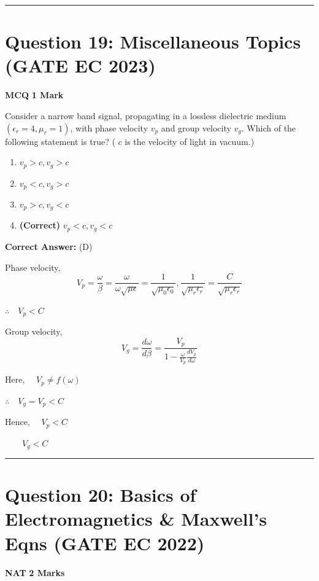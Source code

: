 \documentclass[11pt,a4paper]{article}
\begin{document}
\vspace{1.5em}
\hrule
\vspace{1.5em}

\section*{Question 19: Miscellaneous Topics (GATE EC 2023)}
\noindent \textbf{\color{primary}MCQ} \hfill \textbf{\color{secondary}1 Mark}


\noindent Consider a narrow band signal, propagating in a lossless dielectric medium $\left(\epsilon_{r}=4, \mu_{r}=1\right)$, with phase velocity $v_{p}$ and group velocity $v_{g}$. Which of the following statement is true? ( $c$ is the velocity of light in vacuum.)


\begin{enumerate}[label=(\Alph*)]
    \item $v_{p} > c, v_{g} > c$
    \item $v_{p} < c, v_{g} > c$
    \item $v_{p} > c, v_{g} < c$
    \item \textbf{(Correct)} $v_{p} < c, v_{g} < c$
\end{enumerate}

\noindent \textbf{Correct Answer:} (D)

\begin{tcolorbox}[solbox, title=Detailed Solution -- Question 19]
Phase velocity, 
\[
V_{p}=\frac{\omega}{\beta}=\frac{\omega}{\omega \sqrt{\mu \epsilon}}=\frac{1}{\sqrt{\mu_{0} \epsilon_{0}}}, \frac{1}{\sqrt{\mu_{r} \epsilon_{r}}}=\frac{C}{\sqrt{\mu_{r} \epsilon_{r}}}
\]

$\therefore \quad V_{p} < C$

Group velocity, 
\[
V_{g}=\frac{d \omega}{d \beta}=\frac{V_{p}}{1-\frac{\omega}{V_{p}} \frac{d V_{p}}{d \omega}}
\]

Here, $\quad V_{p} \neq f(\omega)$

$\therefore \quad V_{g}=V_{p} < C$

Hence, $\quad V_{p} < C$

$\quad \quad V_{g} < C$
\end{tcolorbox}

\vspace{1.5em}
\hrule
\vspace{1.5em}

\section*{Question 20: Basics of Electromagnetics \& Maxwell's Eqns (GATE EC 2022)}
\noindent \textbf{\color{primary}NAT} \hfill \textbf{\color{secondary}2 Marks}
\end{document}
